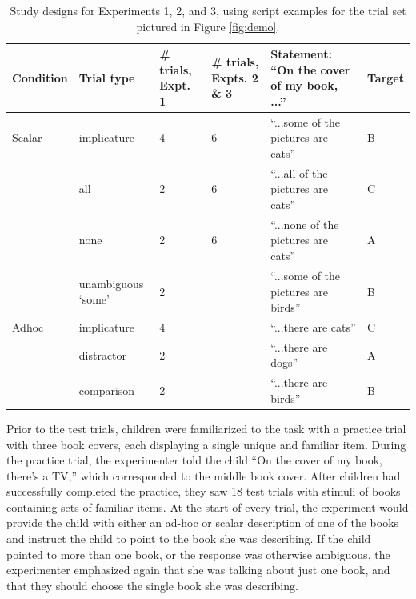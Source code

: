 \documentclass[man]{apa2}
\begin{document}
 \begin{table}
 \footnotesize
 \centering 
     \begin{tabular}{C{1.5cm} C{2cm} C{1.5cm} C{1.5cm} C{4.5cm} C{1.5cm}} 
                      \hline 
       \null   Condition  & Trial type & \# trials, Expt. 1 & \# trials, Expts. 2 \& 3 & Statement: ``On the cover of my book, ...'' & Target   \\ 
       \hline  
            Scalar & implicature & 4 & 6 &  ``...some of the pictures are cats'' & B	 \\ 
          & all  & 2 &  6 & ``...all of the pictures are cats'' & C		                 \\
           & none  & 2 & 6 & ``...none of the pictures are cats'' & A			\\ 
               & unambiguous `some' 	&  2 &  & ``...some of the pictures are birds'' & B					        \\ 
	\hline
	    Adhoc       & implicature & 4 &  & ``...there are cats'' & C 		\\ 
	     & distractor & 2 &  & ``...there are dogs'' & A	     \\ 
          & comparison & 2 &  & ``...there are birds'' & B 	   \\
       \hline 
     \end{tabular} 
     \caption{Study designs for Experiments 1, 2, and 3, using script examples for the trial set pictured in Figure \ref{fig:demo}.  \label{tab:scripts} }
 \end{table}
 

Prior to the test trials, children were familiarized to the task with a practice trial with three book covers, each displaying a single unique and familiar item.  During the practice trial, the experimenter told the child ``On the cover of my book, there's a TV,'' which corresponded to the middle book cover. After children had successfully completed the practice, they saw 18 test trials with stimuli of books containing sets of familiar items. At the start of every trial, the experiment would provide the child with either an ad-hoc or scalar description of one of the books and instruct the child to point to the book she was describing. If the child pointed to more than one book, or the response was otherwise ambiguous, the experimenter emphasized again that she was talking about just one book, and that they should choose the single book she was describing. 
\end{document}
